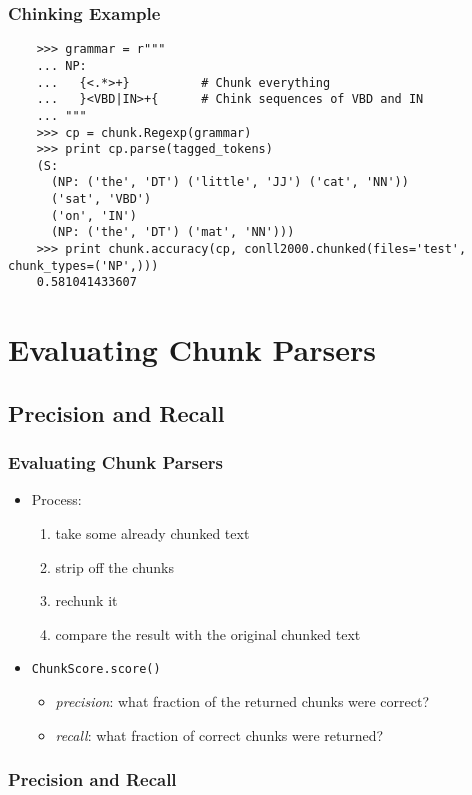 \documentclass{beamer}             %
\begin{document}
\begin{frame}[fragile]
  \frametitle{Chinking Example}
  \scriptsize

\begin{verbatim}
    >>> grammar = r"""
    ... NP:
    ...   {<.*>+}          # Chunk everything
    ...   }<VBD|IN>+{      # Chink sequences of VBD and IN
    ... """
    >>> cp = chunk.Regexp(grammar)
    >>> print cp.parse(tagged_tokens)
    (S:
      (NP: ('the', 'DT') ('little', 'JJ') ('cat', 'NN'))
      ('sat', 'VBD')
      ('on', 'IN')
      (NP: ('the', 'DT') ('mat', 'NN')))
    >>> print chunk.accuracy(cp, conll2000.chunked(files='test', chunk_types=('NP',)))
    0.581041433607
\end{verbatim}
\end{frame}

\section{Evaluating Chunk Parsers}

\subsection{Precision and Recall}

\begin{frame}
  \frametitle{Evaluating Chunk Parsers}

  \begin{itemize}
  \item Process:
    \begin{enumerate}
    \item take some already chunked text
    \item strip off the chunks
    \item rechunk it
    \item compare the result with the original chunked text
    \end{enumerate}
  \item \texttt{ChunkScore.score()}
    \begin{itemize}
    \item \textit{precision}: what fraction of the returned chunks were correct?
    \item \textit{recall}: what fraction of correct chunks were returned?
    \end{itemize}
  \end{itemize}
\end{frame}

\begin{frame}
  \frametitle{Precision and Recall}
  \centerline{}
\end{frame}
\end{document}

